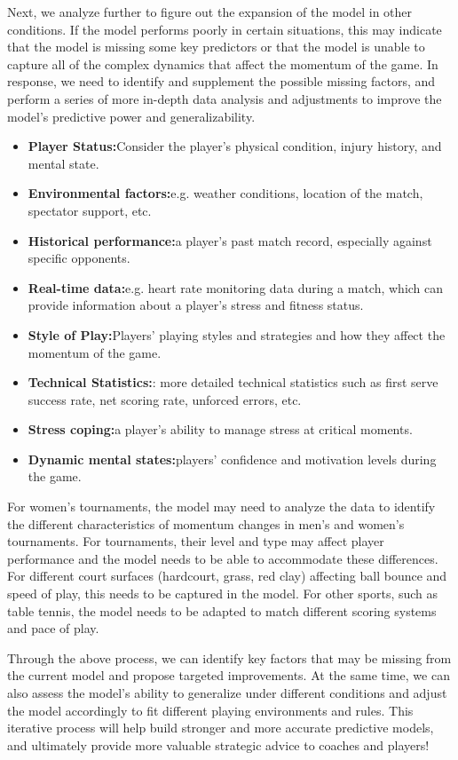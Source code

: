 \documentclass{mcmthesis}
\begin{document}
Next, we analyze further to figure out the expansion of the model in other conditions. If the
model performs poorly in certain situations, this may indicate that the model is missing some key
predictors or that the model is unable to capture all of the complex dynamics that affect the
momentum of the game. In response, we need to identify and supplement the possible missing
factors, and perform a series of more in-depth data analysis and adjustments to improve the
model's predictive power and generalizability.
\begin{itemize}
    \item {\bf Player Status:}Consider the player's physical condition, injury history, and mental state.
    \item {\bf Environmental factors:}e.g. weather conditions, location of the match, spectator support, etc.
    \item {\bf Historical performance:}a player's past match record, especially against specific
    opponents.
    \item {\bf Real-time data:}e.g. heart rate monitoring data during a match, which can provide
    information about a player's stress and fitness status.
    \item {\bf Style of Play:}Players' playing styles and strategies and how they affect the momentum of
    the game.
    \item {\bf Technical Statistics:}: more detailed technical statistics such as first serve success rate, net
    scoring rate, unforced errors, etc.
    \item {\bf Stress coping:}a player's ability to manage stress at critical moments.
    \item {\bf Dynamic mental states:}players' confidence and motivation levels during the game.
\end{itemize}

For women's tournaments, the model may need to analyze the data to identify the different
characteristics of momentum changes in men's and women's tournaments. For tournaments, their
level and type may affect player performance and the model needs to be able to accommodate
these differences. For different court surfaces (hardcourt, grass, red clay) affecting ball bounce and
speed of play, this needs to be captured in the model. For other sports, such as table tennis, the
model needs to be adapted to match different scoring systems and pace of play.

Through the above process, we can identify key factors that may be missing from the current
model and propose targeted improvements. At the same time, we can also assess the model's
ability to generalize under different conditions and adjust the model accordingly to fit different
playing environments and rules. This iterative process will help build stronger and more accurate
predictive models, and ultimately provide more valuable strategic advice to coaches and players!
\end{document}
